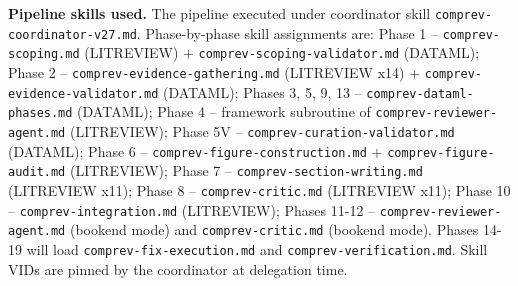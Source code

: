 \documentclass[11pt]{article}
\begin{document}
\textbf{Pipeline skills used.} The pipeline executed under coordinator skill \texttt{comprev-coordinator-v27.md}. Phase-by-phase skill assignments are: Phase 1 -- \texttt{comprev-scoping.md} (LITREVIEW) + \texttt{comprev-scoping-validator.md} (DATAML); Phase 2 -- \texttt{comprev-evidence-gathering.md} (LITREVIEW x14) + \texttt{comprev-evidence-validator.md} (DATAML); Phases 3, 5, 9, 13 -- \texttt{comprev-dataml-phases.md} (DATAML); Phase 4 -- framework subroutine of \texttt{comprev-reviewer-agent.md} (LITREVIEW); Phase 5V -- \texttt{comprev-curation-validator.md} (DATAML); Phase 6 -- \texttt{comprev-figure-construction.md} + \texttt{comprev-figure-audit.md} (LITREVIEW); Phase 7 -- \texttt{comprev-section-writing.md} (LITREVIEW x11); Phase 8 -- \texttt{comprev-critic.md} (LITREVIEW x11); Phase 10 -- \texttt{comprev-integration.md} (LITREVIEW); Phases 11-12 -- \texttt{comprev-reviewer-agent.md} (bookend mode) and \texttt{comprev-critic.md} (bookend mode). Phases 14-19 will load \texttt{comprev-fix-execution.md} and \texttt{comprev-verification.md}. Skill VIDs are pinned by the coordinator at delegation time.




\end{document}
